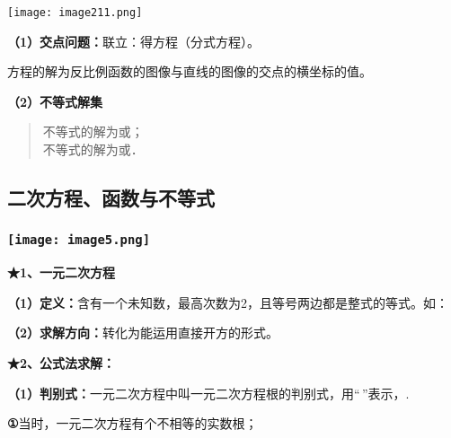 \texttt{[image: image211.png]}

\textbf{（1）交点问题：}联立：得方程（分式方程）。

方程的解为反比例函数的图像与直线的图像的交点的横坐标的值。

\textbf{（2）不等式解集}

\begin{quote}
不等式的解为或；\\
不等式的解为或．
\end{quote}

\hypertarget{ux4e8cux6b21ux65b9ux7a0bux51fdux6570ux4e0eux4e0dux7b49ux5f0f}{%
\subsection{\texorpdfstring{
二次方程、函数与不等式}{ 二次方程、函数与不等式}}\label{ux4e8cux6b21ux65b9ux7a0bux51fdux6570ux4e0eux4e0dux7b49ux5f0f}}

\hypertarget{ux5b66ux79d1ux7f51www.zxxk.com--ux6559ux80b2ux8d44ux6e90ux95e8ux6237ux63d0ux4f9bux8bd5ux9898ux8bd5ux5377ux6559ux6848ux8bfeux4ef6ux6559ux5b66ux8bbaux6587ux7d20ux6750ux7b49ux5404ux7c7bux6559ux5b66ux8d44ux6e90ux5e93ux4e0bux8f7dux8fd8ux6709ux5927ux91cfux4e30ux5bccux7684ux6559ux5b66ux8d44ux8baf-38}{%
\subsubsection{\texorpdfstring{\protect\texttt{[image: image5.png]}}{学科网(www.zxxk.com)-\/-教育资源门户，提供试题试卷、教案、课件、教学论文、素材等各类教学资源库下载，还有大量丰富的教学资讯！}}\label{ux5b66ux79d1ux7f51www.zxxk.com--ux6559ux80b2ux8d44ux6e90ux95e8ux6237ux63d0ux4f9bux8bd5ux9898ux8bd5ux5377ux6559ux6848ux8bfeux4ef6ux6559ux5b66ux8bbaux6587ux7d20ux6750ux7b49ux5404ux7c7bux6559ux5b66ux8d44ux6e90ux5e93ux4e0bux8f7dux8fd8ux6709ux5927ux91cfux4e30ux5bccux7684ux6559ux5b66ux8d44ux8baf-38}}

\textbf{★1、一元二次方程}

\textbf{（1）定义：}含有一个未知数，最高次数为2，且等号两边都是整式的等式。如：

\textbf{（2）求解方向：}转化为能运用直接开方的形式。

\textbf{★2、公式法求解：}

\textbf{（1）判别式：}一元二次方程中叫一元二次方程根的判别式，用``\,''表示，.

\textbf{①}当时，一元二次方程有个不相等的实数根；


